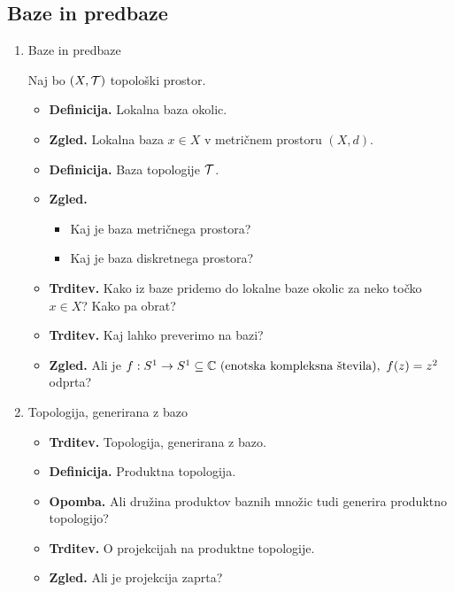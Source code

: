 \subsection{Baze in predbaze}
\begin{enumerate}
    \item Baze in predbaze
    
    Naj bo \((X, \mathcal{T})\) topološki prostor.
    \begin{itemize}
        \item \textbf{Definicija.} Lokalna baza okolic.
        \item \textbf{Zgled.} Lokalna baza \(x \in X\) v metričnem prostoru \((X, d)\).
        \item \textbf{Definicija.} Baza topologije \(\mathcal{T}\).
        \item \textbf{Zgled.} \ 
        \begin{itemize}
            \item Kaj je baza metričnega prostora?
            \item Kaj je baza diskretnega prostora?
        \end{itemize}
        \newpage
        \item \textbf{Trditev.} Kako iz baze pridemo do lokalne baze okolic za neko točko \(x \in X\)? Kako pa obrat?
        \item \textbf{Trditev.} Kaj lahko preverimo na bazi?
        \item \textbf{Zgled.} Ali je $f: S^1 \to S^1 \subseteq \mathbb{C} \text{ (enotska kompleksna števila)}, \ f(z) = z^2$ odprta?
    \end{itemize}

    \item Topologija, generirana z bazo
    \begin{itemize}
        \item \textbf{Trditev.} Topologija, generirana z bazo.
        \item \textbf{Definicija.} Produktna topologija.
        \item \textbf{Opomba.} Ali družina produktov baznih množic tudi generira produktno topologijo?
        \item \textbf{Trditev.} O projekcijah na produktne topologije.
        \item \textbf{Zgled.} Ali je projekcija zaprta? 
    \end{itemize}
\end{enumerate}

